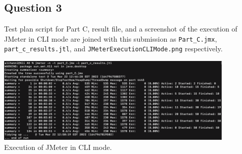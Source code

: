 \subsection*{Question 3}

\noindent Test plan script for Part C, result file, and a screenshot of the execution of JMeter in CLI mode are joined with this submission as \verb|Part_C.jmx|, \verb|part_c_results.jtl|, and \verb|JMeterExecutionCLIMode.png| respectively.

\begin{center}
        \includegraphics[width=0.85\textwidth]{img/img3.png}
        \noindent  \\Execution of JMeter in CLI mode.
\end{center}
